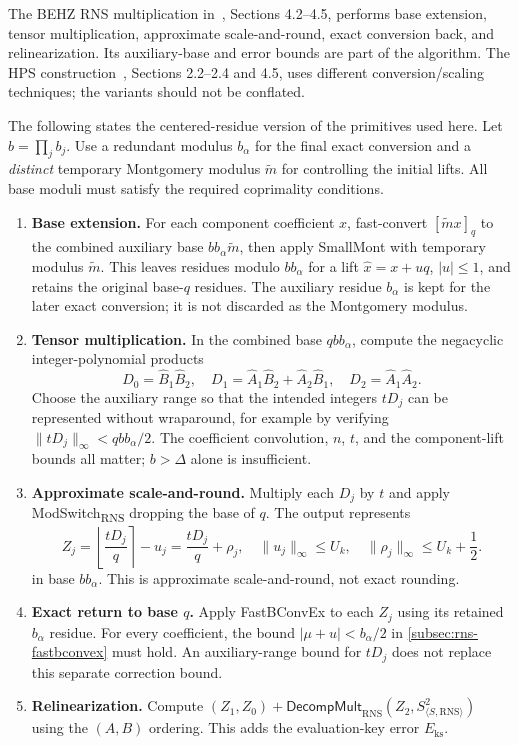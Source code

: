 The BEHZ RNS multiplication in~\cite{rns-bfv}, Sections 4.2--4.5, performs base extension, tensor multiplication, approximate scale-and-round, exact conversion back, and relinearization. Its auxiliary-base and error bounds are part of the algorithm. The HPS construction~\cite{rns-bfv-hps}, Sections 2.2--2.4 and 4.5, uses different conversion/scaling techniques; the variants should not be conflated.

The following states the centered-residue version of the primitives used here. Let $b=\prod_jb_j$. Use a redundant modulus $b_\alpha$ for the final exact conversion and a \emph{distinct} temporary Montgomery modulus $\widetilde m$ for controlling the initial lifts. All base moduli must satisfy the required coprimality conditions.
\begin{enumerate}
\item \textbf{Base extension.} For each component coefficient $x$, fast-convert $[\widetilde m x]_q$ to the combined auxiliary base $bb_\alpha\widetilde m$, then apply \textsf{SmallMont} with temporary modulus $\widetilde m$. This leaves residues modulo $bb_\alpha$ for a lift $\widehat x=x+uq$, $|u|\leq1$, and retains the original base-$q$ residues. The auxiliary residue $b_\alpha$ is kept for the later exact conversion; it is not discarded as the Montgomery modulus.
\item \textbf{Tensor multiplication.} In the combined base $qbb_\alpha$, compute the negacyclic integer-polynomial products
\[
D_0=\widehat B_1\widehat B_2,\quad
D_1=\widehat A_1\widehat B_2+\widehat A_2\widehat B_1,\quad
D_2=\widehat A_1\widehat A_2.
\]
Choose the auxiliary range so that the intended integers $tD_j$ can be represented without wraparound, for example by verifying $\|tD_j\|_\infty<qbb_\alpha/2$. The coefficient convolution, $n$, $t$, and the component-lift bounds all matter; $b>\Delta$ alone is insufficient.
\item \textbf{Approximate scale-and-round.} Multiply each $D_j$ by $t$ and apply \textsf{ModSwitch\textsubscript{RNS}} dropping the base of $q$. The output represents
\[
Z_j=\left\lfloor\frac{tD_j}{q}\right\rceil-u_j
=\frac{tD_j}{q}+\rho_j,\quad
\|u_j\|_\infty\leq U_k,\quad
\|\rho_j\|_\infty\leq U_k+\frac12.
\]
in base $bb_\alpha$. This is approximate scale-and-round, not exact rounding.
\item \textbf{Exact return to base $q$.} Apply \textsf{FastBConvEx} to each $Z_j$ using its retained $b_\alpha$ residue. For every coefficient, the bound $|\mu+u|<b_\alpha/2$ in \autoref{subsec:rns-fastbconvex} must hold. An auxiliary-range bound for $tD_j$ does not replace this separate correction bound.
\item \textbf{Relinearization.} Compute $(Z_1,Z_0)+\textsf{DecompMult}_{\mathrm{RNS}}(Z_2,S^2_{\langle S,\mathrm{RNS}\rangle})$ using the $(A,B)$ ordering. This adds the evaluation-key error $E_{\mathrm{ks}}$.
\end{enumerate}

